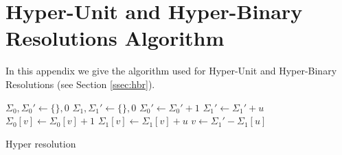 \chapter{Hyper-Unit and Hyper-Binary Resolutions Algorithm}
\label{chap:algorithms}

In this appendix we give the algorithm used for Hyper-Unit and
Hyper-Binary Resolutions (see Section \ref{ssec:hbr}).

\begin{algorithm}[h]
  \begin{algorithmic}

    \STATE $\Sigma_0, \Sigma_0' \gets \{\}, 0$
    \STATE $\Sigma_1, \Sigma_1' \gets \{\}, 0$
        \STATE $\Sigma_0' \gets \Sigma_0' + 1$
        \STATE $\Sigma_1' \gets \Sigma_1' + u$
          \STATE $\Sigma_0[v] \gets \Sigma_0[v] + 1$
          \STATE $\Sigma_1[v] \gets \Sigma_1[v] + u$
        \ENDFOR
      \ENDFOR
          \STATE $v \gets \Sigma_1' - \Sigma_1[u]$
        \ENDIF
      \ENDFOR
    \ENDFOR
  \end{algorithmic}

  \caption{Hyper resolution}
  \label{alg:hyper-resolution}
\end{algorithm}

